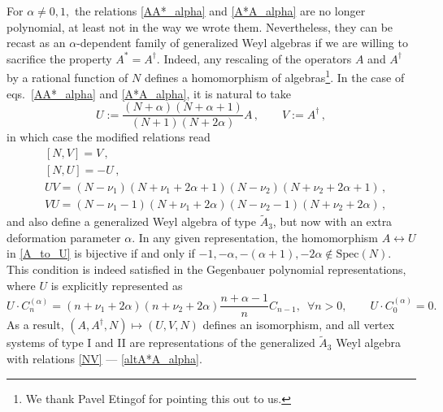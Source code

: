 \documentclass{article}
\def \ag {\alpha}
\begin{document}
For $\ag \neq 0,1,$ the relations \eqref{AA*_alpha} and \eqref{A*A_alpha} are no longer 
polynomial, at least not in the way we wrote them. Nevertheless, they can be recast as an 
$\ag$-dependent family of generalized Weyl algebras if we are willing to sacrifice the 
property $A^\ast = A^\dagger$. Indeed, any rescaling of the operators $A$ and 
$A^{\dagger}$ by a rational function of $N$ defines a homomorphism of 
algebras\footnote{We thank Pavel Etingof for pointing this out to us.}. In the 
case of eqs.\ \eqref{AA*_alpha} and \eqref{A*A_alpha}, it is natural to take
\begin{equation}
U := \frac{(N+\ag)(N+\ag+1)}{(N+1)(N+2\ag)} A\,, \qquad V := A^{\dagger}\,, \label{A_to_U}
\end{equation}
in which case the modified relations read
\begin{align}
    &[N,V] = V\,, \label{NV}\\
    &[N,U]=-U\,, \label{NU} \\
    & U V =  (N-\nu_1)(N+\nu_1+2\ag+1)(N-\nu_2)(N+\nu_2+2\ag+1)\,, \label{altAA*_alpha}\\ 
    & V U =  (N-\nu_1-1)(N+\nu_1+2\ag)(N-\nu_2-1)(N+\nu_2+2\ag)\,, \label{altA*A_alpha}
\end{align}
and also define a generalized Weyl algebra of type $\tilde{A}_3$, but now with an extra 
deformation parameter $\ag$. In any given representation, the homomorphism $A \longleftrightarrow U$ in \eqref{A_to_U} is bijective if and only if $-1,-\alpha,-(\alpha+1), 
-2\alpha \notin \mathrm{Spec}(N)$. This condition is indeed satisfied in the Gegenbauer polynomial
representations, where $U$ is explicitly represented as  
\begin{equation}
U \cdot C_n^{(\ag)} = (n+\nu_1+2\ag)(n+\nu_2+2\ag) \frac{n+\ag-1}{n} C_{n-1}, \,\,\, \forall n>0, 
\qquad U \cdot C_0^{(\ag)} = 0.
\end{equation}
As a result, $(A,A^{\dagger},N) \mapsto (U,V,N)$ defines an isomorphism, and all vertex systems of type I and II are representations of the generalized $\tilde{A}_3$ Weyl algebra with relations \eqref{NV} --- \eqref{altA*A_alpha}.
\medskip 
\end{document}
